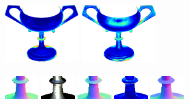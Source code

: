 \begin{minipage}{0.97\textwidth}
 \includegraphics[width=0.243\textwidth]{ch-psfcn/images/Results/DiLiGenT/DPSN/goblet_diff.png}
 \includegraphics[width=0.243\textwidth]{ch-psfcn/images/Results/DiLiGenT/L2/gobletPNGl2_diff.png}
 \vspace{-2.7em}
 \\
 \makebox[0.243\textwidth]{\footnotesize } 
 \vspace{-0.8em}
 \\
 \includegraphics[width=0.110\textwidth]{ch-psfcn/images/Results/goblet_crop/gobletPNGGT_normal_crop.png}\hspace{-0.2em}
    \includegraphics[width=0.110\textwidth]{ch-psfcn/images/Results/goblet_crop/4.0_gobletPNG_001_crop.png}
    \hfill
    \includegraphics[width=0.110\textwidth]{ch-psfcn/images/Results/goblet_crop/gobletPNGDiLiGenT_normal_crop.png}\hspace{-0.2em}
    \includegraphics[width=0.110\textwidth]{ch-psfcn/images/Results/goblet_crop/gobletPNGDiLiGenT_diff_crop.png}
    \hfill
    \includegraphics[width=0.110\textwidth]{ch-psfcn/images/Results/goblet_crop/goblet_normal_DPSN_crop.png}\hspace{-0.2em}

\end{minipage}
